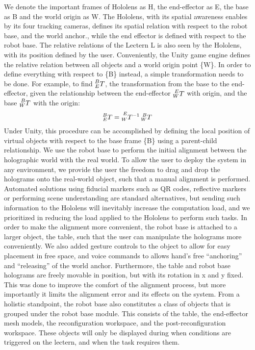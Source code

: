 We denote the important frames of Hololens as {H}, the end-effector as {E}, the base as {B} and the world origin as {W}.  The Hololens, with its spatial awareness enables by its four tracking cameras, defines its spatial relation with respect to the robot base, and the world anchor., while the end effector is defined with respect to the robot base. The relative relations of the Lectern {L} is also seen by the Hololens, with its position defined by the user. 
Conveniently, the Unity game engine defines the relative relation between all objects and a world origin point \{W\}. In order to define everything with respect to \{B\} instead, a simple transformation needs to be done. For example, to find $\prescript{B}{E}{T}$, the transformation from the base to the end-effector, given the relationship between the end-effector $\prescript{E}{W}{T}$ with origin, and the base $\prescript{B}{W}{T}$ with the origin:
\small
\begin{align}
    \prescript{B}{E}{T} = \prescript{E}{W}{T^{-1}} \prescript{B}{W}{T}
\end{align}
\normalsize
Under Unity, this procedure can be accomplished by defining the local position of virtual objects with respect to the base frame \{B\} using a parent-child relationship.
We use the robot base to perform the initial alignment between the holographic world with the real world. To allow the user to deploy the system in any environment, we provide the user the freedom to drag and drop the holograms onto the real-world object, such that a manual alignment is performed. Automated solutions using fiducial markers such as QR codes, reflective markers or performing scene understanding are standard alternatives, but sending such information to the Hololens will inevitably increase the computation load, and we prioritized in reducing the load applied to the Hololens to perform such tasks.
In order to make the alignment more convenient, the robot base is attached to a larger object, the table, such that the user can manipulate the holograms more conveniently. We also added gesture controls to the object to allow for easy placement in free space, and voice commands to allows hand’s free “anchoring” and “releasing” of the world anchor. Furthermore, the table and robot base holograms are freely movable in position, but with its rotation in x and y fixed. This was done to improve the comfort of the alignment process, but more importantly it limits the alignment error and its effects on the system.
From a holistic standpoint, the robot base also constitutes a class of objects that is grouped under the robot base module. This consists of the table, the end-effector mesh models, the reconfiguration workspace, and the post-reconfiguration workspace. These objects will only be displayed during when conditions are triggered on the lectern, and when the task requires them.

